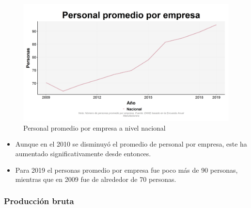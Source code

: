     \begin{figure}[H]
        \caption{Personal promedio por empresa a nivel nacional \label{map_result_2} }
        \begin{center}
        \includegraphics[width=\textwidth,keepaspectratio]{img/var_221_trend.png}
        \end{center}
    \end{figure}
            \begin{itemize}
                    \item Aunque en el 2010 se disminuyó el promedio de personal por empresa, este ha aumentado significativamente desde entonces.
                    \item Para 2019 el personas promedio por empresa fue poco más de 90 personas, mientras que en 2009 fue de alrededor de 70 personas.
                    \end{itemize}

        \subsubsection{Producción bruta}

